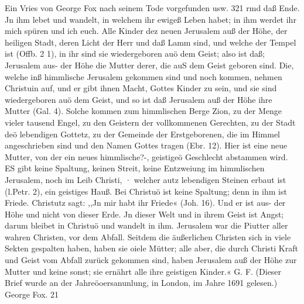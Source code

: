 Ein Vries von George Fox nach seinem Tode vorgefunden usw. 321
rmd daß Ende. Jn ihm lebet und wandelt, in welchem ihr
ewigeß Leben habet; in ihm werdet ihr mich spüren und ich euch.
Alle Kinder dez neuen Jerusalem auß der Höhe, der heiligen
Stadt, deren Licht der Herr und daß Lamm sind, und welche der
Tempel ist (Offb. 2 1), in ihr sind sie wiedergeboren auö dem
Geist; also ist daß; Jerusalem aus- der Höhe die Mutter derer,
die auS dem Geist geboren sind. Die, welche inß himmlische
Jerusalem gekommen sind und noch kommen, nehmen Christuin
auf, und er gibt ihnen Macht, Gottes Kinder zu sein, und sie sind
wiedergeboren auö dem Geist, und so ist daß Jerusalem auß der
Höhe ihre Mutter (Gal. 4). Solche kommen zum himmlischen
Berge Zion, zu der Menge vieler tausend Engel, zu den Geistern
der vollkommenen Gerechten, zu der Stadt deö lebendigen Gottetz,
zu der Gemeinde der Erstgeborenen, die im Himmel angeschrieben
sind und den Namen Gottes tragen (Ebr. 12). Hier ist eine
neue Mutter, von der ein neues himmlische?-, geistigeö Geschlecht
abstammen wird. ES gibt keine Spaltung, keinen Streit, keine
Entzweiung im himmlischen Jerusalem, noch im Leib Christi,
· welcher autz lebendigen Steinen erbaut ist (l.Petr. 2), ein geistiges
Hauß. Bei Christuö ist keine Spaltung; denn in ihm ist Friede.
Christutz sagt: ,,Jn mir habt ihr Friede« (Joh. 16). Und er ist
aus- der Höhe und nicht von dieser Erde. Jn dieser Welt und
in ihrem Geist ist Angst; darum bleibet in Christuö und wandelt
in ihm.
Jerusalem war die Piutter aller wahren Christen, vor dem
Abfall. Seitdem die äußerlichen Christen sich in viele Sekten
gespalten haben, haben sie oiele Mütter; alle aber, die durch
Christi Kraft und Geist vom Abfall zurück gekommen sind, haben
Jerusalem auß der Höhe zur Mutter und keine sonst; sie ernährt
alle ihre geistigen Kinder.« G. F.
(Dieser Brief wurde an der Jahreöoersanunlung, in London,
im Jahre 1691 gelesen.)
George Fox. 21




